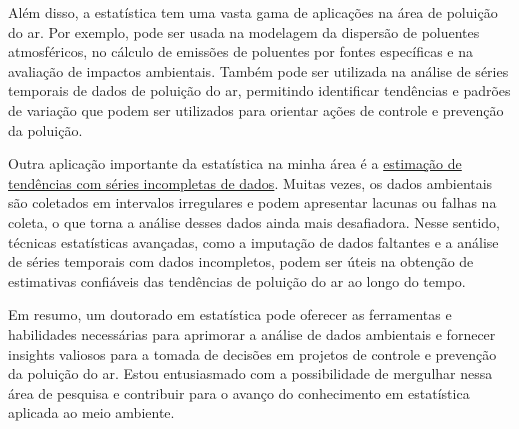 \documentclass[12pt,a4paper]{article}
\begin{document}
	Além disso, a estatística tem uma vasta gama de aplicações na área de poluição do ar. Por exemplo, pode ser usada na modelagem da dispersão de poluentes atmosféricos, no cálculo de emissões de poluentes por fontes específicas e na avaliação de impactos ambientais. Também pode ser utilizada na análise de séries temporais de dados de poluição do ar, permitindo identificar tendências e padrões de variação que podem ser utilizados para orientar ações de controle e prevenção da poluição.
	
	Outra aplicação importante da estatística na minha área é a \underline{estimação de} \underline{tendências com séries incompletas de dados}. Muitas vezes, os dados ambientais são coletados em intervalos irregulares e podem apresentar lacunas ou falhas na coleta, o que torna a análise desses dados ainda mais desafiadora. Nesse sentido, técnicas estatísticas avançadas, como a imputação de dados faltantes e a análise de séries temporais com dados incompletos, podem ser úteis na obtenção de estimativas confiáveis das tendências de poluição do ar ao longo do tempo.
	
	Em resumo, um doutorado em estatística pode oferecer as ferramentas e habilidades necessárias para aprimorar a análise de dados ambientais e fornecer insights valiosos para a tomada de decisões em projetos de controle e prevenção da poluição do ar. Estou entusiasmado com a possibilidade de mergulhar nessa área de pesquisa e contribuir para o avanço do conhecimento em estatística aplicada ao meio ambiente.
	
	\label{LastPage}
\end{document}
